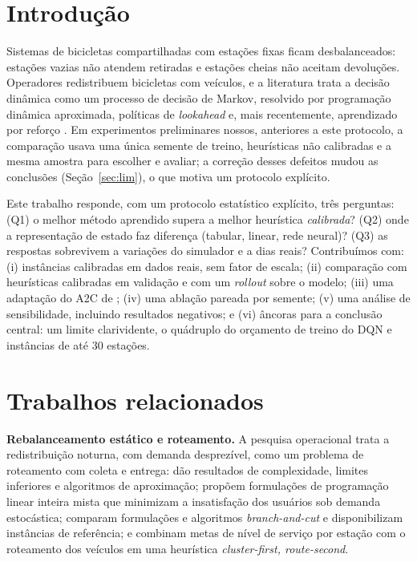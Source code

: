\documentclass[12pt,a4paper]{article}
\begin{document}
\section{Introdu\c{c}\~ao}
Sistemas de bicicletas compartilhadas com esta\c{c}\~oes fixas ficam desbalanceados: esta\c{c}\~oes vazias n\~ao atendem retiradas e esta\c{c}\~oes
cheias n\~ao aceitam devolu\c{c}\~oes. Operadores redistribuem bicicletas com ve\'iculos, e a literatura trata a decis\~ao din\^amica como um processo de
decis\~ao de Markov, resolvido por programa\c{c}\~ao din\^amica aproximada, pol\'iticas de \emph{lookahead} e, mais recentemente, aprendizado por refor\c{c}o
\citep{seo2022,liang2024,brinkmann2019,guo2024}. Em experimentos preliminares nossos, anteriores a este protocolo, a compara\c{c}\~ao usava uma \'unica semente de treino, heur\'isticas
n\~ao calibradas e a mesma amostra para escolher e avaliar; a corre\c{c}\~ao desses defeitos mudou as conclus\~oes (Se\c{c}\~ao~\ref{sec:lim}), o que
motiva um protocolo expl\'icito.

Este trabalho responde, com um protocolo estat\'istico expl\'icito, tr\^es perguntas: (Q1) o melhor m\'etodo aprendido supera a melhor heur\'istica
\emph{calibrada}? (Q2) onde a representa\c{c}\~ao de estado faz diferen\c{c}a (tabular, linear, rede neural)? (Q3) as respostas sobrevivem a
varia\c{c}\~oes do simulador e a dias reais? Contribu\'imos com: (i) inst\^ancias calibradas em dados reais, sem fator de escala; (ii) compara\c{c}\~ao com
heur\'isticas calibradas em valida\c{c}\~ao e com um \emph{rollout} sobre o modelo; (iii) uma adapta\c{c}\~ao do A2C de \citet{seo2022}; (iv) uma abla\c{c}\~ao
pareada por semente; (v) uma an\'alise de sensibilidade, incluindo resultados negativos; e (vi) \^ancoras para a conclus\~ao central: um limite clarividente, o qu\'adruplo do or\c{c}amento de treino do DQN e inst\^ancias de at\'e 30 esta\c{c}\~oes.

\section{Trabalhos relacionados}
\textbf{Rebalanceamento est\'atico e roteamento.} A pesquisa operacional trata a redistribui\c{c}\~ao noturna, com demanda desprez\'ivel, como um problema de
roteamento com coleta e entrega: \citet{benchimol2011} d\~ao resultados de complexidade, limites inferiores e algoritmos de aproxima\c{c}\~ao;
\citet{raviv2013} propõem formula\c{c}\~oes de programa\c{c}\~ao linear inteira mista que minimizam a insatisfa\c{c}\~ao dos usu\'arios sob demanda estoc\'astica;
\citet{dellamico2014} comparam formula\c{c}\~oes e algoritmos \emph{branch-and-cut} e disponibilizam inst\^ancias de refer\^encia; e \citet{schuijbroek2017}
combinam metas de n\'ivel de servi\c{c}o por esta\c{c}\~ao com o roteamento dos ve\'iculos em uma heur\'istica \emph{cluster-first, route-second}.
\end{document}

